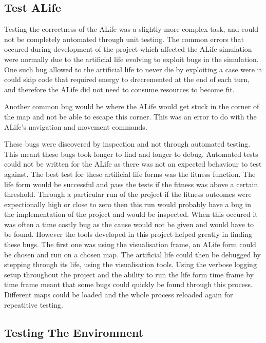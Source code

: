 \documentclass[12pt]{article}
\begin{document}
\subsection{Test ALife}

Testing the correctness of the ALife was a slightly more complex task, and could not be completely automated through unit testing.
The common errors that occured during development of the project which affected the ALife simulation were normally due to the
artificial life evolving to exploit bugs in the simulation. One such bug allowed to the artificial life to never die by exploiting
a case were it could skip code that required energy to drecremented at the end of each turn, and therefore the ALife did not need
to consume resources to become fit.

Another common bug would be where the ALife would get stuck in the corner of the map and not be able to escape this corner. This
was an error to do with the ALife's navigation and movement commands.

These bugs were discovered by inspection and not through automated testing. This meant these bugs took longer to find and longer to
debug. Automated tests could not be written for the ALife as there was not an expected behaviour to test against. The best
test for these artificial life forms was the fitness function. The life form would be successful and pass the tests if the fitness
was above a certain threshold. Through a particular run of the project if the fitness outcomes were expectionally high or close to 
zero then this run would probably have a bug in the implementation of the project and would be inspected. When this occured
it was often a time costly bug as the cause would not be given and would have to be found. However the tools developed in this
project helped greatly in finding these bugs. The first one was using the visualisation frame, an ALife form could be chosen
and run on a chosen map. The artificial life could then be debugged by stepping through its life, using the visualisation tools.
Using the verbose logging setup throughout the project and the ability to run the life form time frame by time frame meant that
some bugs could quickly be found through this process. Different maps could be loaded and the whole process reloaded again for
repeatitive testing. 


\subsection{Testing The Environment}
\end{document}

